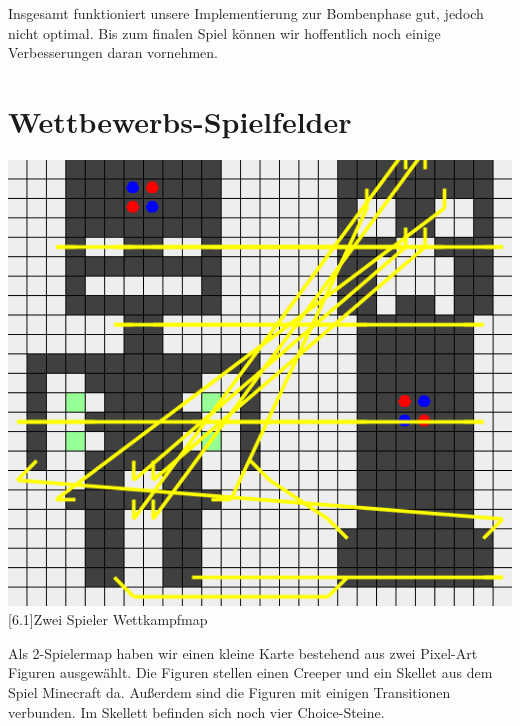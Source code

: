\documentclass[12pt,a4paper,bibliography=totocnumbered,listof=totocnumbered]{scrartcl}
\begin{document}
	Insgesamt funktioniert unsere Implementierung zur Bombenphase gut, jedoch nicht optimal. Bis zum finalen Spiel können wir hoffentlich noch einige Verbesserungen daran vornehmen.

    
    \section{Wettbewerbs-Spielfelder}
    \vspace{1em}

	
	\vspace{1em}
	\begin{minipage}{\linewidth}
		\centering
		\includegraphics[width=0.66\linewidth]{pics/Kapitel_6/CreeperMap.png}
		[6.1]{Zwei Spieler Wettkampfmap}
		\label{fig:6.1}
	\end{minipage}
	\vspace{1em}
	
	Als 2-Spielermap haben wir einen kleine Karte bestehend aus zwei Pixel-Art Figuren ausgewählt. Die Figuren stellen einen Creeper und ein Skellet aus dem Spiel Minecraft da. Außerdem sind die Figuren mit einigen Transitionen verbunden. Im Skellett befinden sich noch vier Choice-Steine.
	
\end{document}
